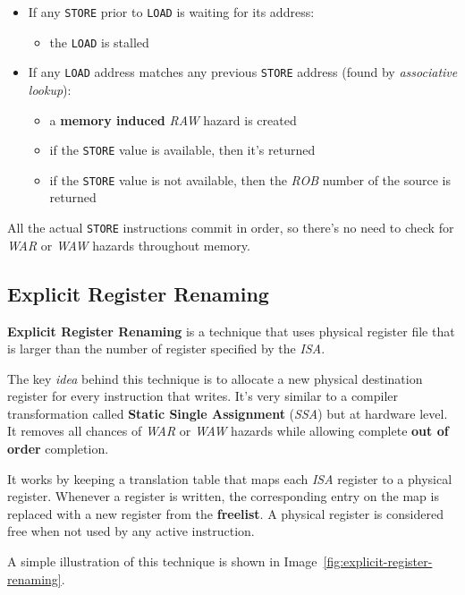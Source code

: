\documentclass[english]{article}
\begin{document}
\begin{itemize}
  \item If any \texttt{STORE} prior to \texttt{LOAD} is waiting for its address:
        \begin{itemize}[label=\(\rightarrow\)]
          \item the \texttt{LOAD} is stalled
        \end{itemize}
  \item If any \texttt{LOAD} address matches any previous \texttt{STORE} address (found by \textit{associative lookup}):
        \begin{itemize}[label=\(\rightarrow\)]
          \item a \textbf{memory induced} \textit{RAW} hazard is created
          \item if the \texttt{STORE} value is available, then it's returned
          \item if the \texttt{STORE} value is not available, then the \textit{ROB} number of the source is returned
        \end{itemize}
\end{itemize}

All the actual \texttt{STORE} instructions commit in order, so there's no need to check for \textit{WAR} or \textit{WAW} hazards throughout memory.

\subsection{Explicit Register Renaming}

\textbf{Explicit Register Renaming} is a technique that uses physical register file that is larger than the number of register specified by the \textit{ISA}.

The key \textit{idea} behind this technique is to allocate a new physical destination register for every instruction that writes.
It's very similar to a compiler transformation called \textbf{Static Single Assignment} (\textit{SSA}) but at hardware level.
It removes all chances of \textit{WAR} or \textit{WAW} hazards while allowing complete \textbf{out of order} completion.

It works by keeping a translation table that maps each \textit{ISA} register to a physical register.
Whenever a register is written, the corresponding entry on the map is replaced with a new register from the \textbf{freelist}.
A physical register is considered free when not used by any active instruction.

A simple illustration of this technique is shown in Image~\ref{fig:explicit-register-renaming}.
\end{document}
